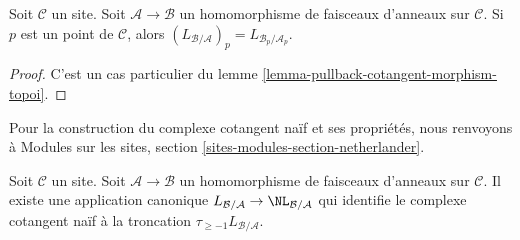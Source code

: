 \begin{lemma}
\label{lemma-stalk-cotangent-complex}
Soit $\mathcal{C}$ un site. Soit $\mathcal{A} \to \mathcal{B}$ un
homomorphisme de faisceaux d'anneaux sur $\mathcal{C}$. Si $p$ est un point de
$\mathcal{C}$, alors
$(L_{\mathcal{B}/\mathcal{A}})_p = L_{\mathcal{B}_p/\mathcal{A}_p}$.
\end{lemma}

\begin{proof}
C'est un cas particulier du lemme
\ref{lemma-pullback-cotangent-morphism-topoi}.
\end{proof}

\noindent
Pour la construction du complexe cotangent naïf et ses propriétés, nous
renvoyons à Modules sur les sites, section
\ref{sites-modules-section-netherlander}.

\begin{lemma}
\label{lemma-compare-cotangent-complex-with-naive}
Soit $\mathcal{C}$ un site. Soit $\mathcal{A} \to \mathcal{B}$ un
homomorphisme de faisceaux d'anneaux sur $\mathcal{C}$. Il existe une
application canonique
$L_{\mathcal{B}/\mathcal{A}} \to \NL_{\mathcal{B}/\mathcal{A}}$ qui identifie
le complexe cotangent naïf à la troncation
$\tau_{\geq -1}L_{\mathcal{B}/\mathcal{A}}$.
\end{lemma}

